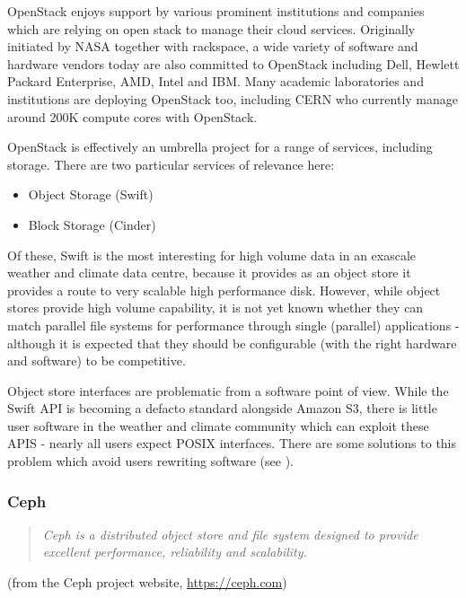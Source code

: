 OpenStack enjoys support by various prominent institutions and companies which are relying on open stack to manage their cloud services.
Originally initiated by NASA together with rackspace\textregistered, a wide variety of software and hardware vendors today are also committed to OpenStack including Dell, Hewlett Packard Enterprise, AMD, Intel and IBM. Many academic
laboratories and institutions are deploying OpenStack too, including CERN
who currently manage around 200K compute cores with OpenStack.

OpenStack is effectively an umbrella project for a range of services, including
storage. There are two particular services of relevance here:
\begin{itemize}
	\item Object Storage (Swift)
	\item Block Storage (Cinder)
\end{itemize}
Of these, Swift is the most interesting for high volume data in an exascale weather and climate data centre, because it provides as an object store it provides a route to very scalable high performance disk. However, while object stores provide
high volume capability, it is not yet known whether they can match parallel
file systems for performance through single (parallel) applications - although it is expected that they should be configurable (with the right hardware and software) to be competitive.

Object store interfaces are problematic from a software point of view. While
the Swift API is becoming a defacto standard alongside Amazon S3, there is
little user software in the weather and climate community which can exploit these
APIS - nearly all users expect POSIX interfaces. There are some solutions to
this problem which avoid users rewriting software (see ).

\subsubsection{Ceph}

\begin{quote}
	\itshape
	Ceph is a distributed object store and file system designed to provide excellent performance, reliability and scalability.
\end{quote}
(from the Ceph project website, \url{https://ceph.com})

